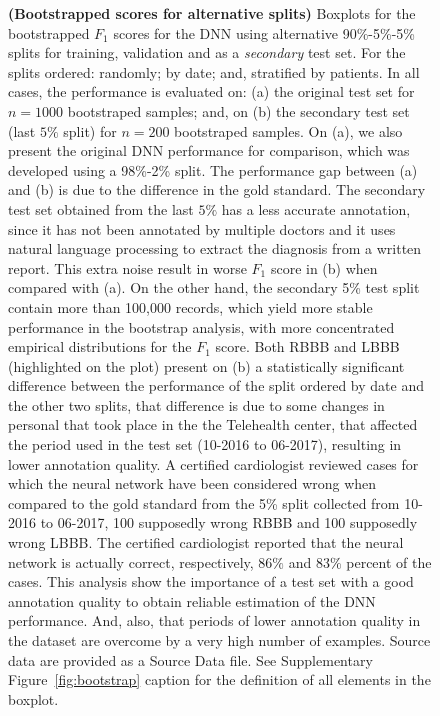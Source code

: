 \documentclass{article}
\begin{document}
\begin{figure}[h]
    \centering
    \caption{\footnotesize{\textbf{(Bootstrapped scores for alternative splits)} Boxplots for the bootstrapped $F_1$ scores for the DNN using alternative 90\%-5\%-5\% splits for training, validation and as a \textit{secondary} test set. For the splits ordered: randomly; by date; and, stratified by patients. In all cases, the performance is evaluated on: (a) the original test set for $n=1000$ bootstraped samples; and, on (b) the secondary test set (last $5\%$ split) for $n=200$ bootstraped samples.   On (a), we also present the original DNN performance for comparison, which was developed using a 98\%-2\% split. The performance gap between (a) and (b) is due to the difference in the gold standard. The secondary test set obtained from the last $5\%$ has a less accurate annotation, since it has not been annotated by multiple doctors and it uses natural language processing to extract the diagnosis from a written report. This extra noise result in worse $F_1$ score in (b) when compared with (a). On the other hand, the secondary 5\% test split contain more than 100,000 records, which yield more stable performance in the bootstrap analysis, with more concentrated empirical distributions for the $F_1$ score. Both RBBB and LBBB (highlighted on the plot) present on (b) a statistically significant difference between the performance of the split ordered by date and the other two splits, that difference is due to some changes in personal that took place in the the Telehealth center, that affected the period used in the test set (10-2016 to 06-2017), resulting in lower annotation quality. A certified cardiologist reviewed  cases for which the neural network have been considered wrong when compared to the gold standard from the 5\% split collected from 10-2016 to 06-2017, 100 supposedly wrong RBBB and 100 supposedly wrong LBBB. The certified cardiologist reported that the neural network is actually correct, respectively, $86\%$ and $83\%$ percent of the cases. This analysis show the importance of a test set with a good annotation quality to obtain reliable estimation of the DNN performance. And, also, that periods of lower annotation quality in the dataset are overcome by a very high number of examples. Source data are provided as a Source Data file. See Supplementary Figure~\ref{fig:bootstrap} caption for the definition of all elements in the boxplot.}}
    \label{fig:boxplot_F1_score_on_newtest}
\end{figure}
\end{document}
